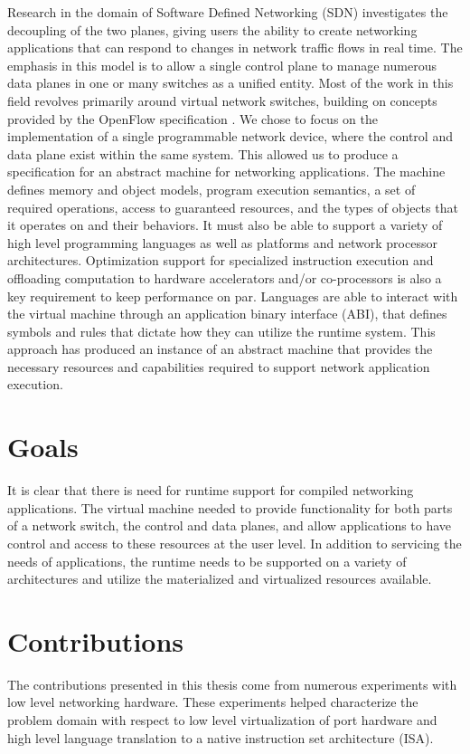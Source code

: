Research in the domain of Software Defined Networking (SDN) investigates the
decoupling of the two planes, giving users the ability to create networking
applications that can respond to changes in network traffic flows in real time.
The emphasis in this model is to allow a single control plane to manage
numerous data planes in one or many switches as a unified entity. Most of the
work in this field revolves primarily around virtual network switches,
building on concepts provided by the OpenFlow specification \cite{openflow}.
We chose to focus on the implementation of a single programmable network
device, where the control and data plane exist within the same system. This
allowed us to produce a specification for an abstract machine for networking
applications. The machine defines memory and object models, program execution
semantics, a set of required operations, access to guaranteed resources, and
the types of objects that it operates on and their behaviors. It must also be
able to support a variety of high level programming languages as well as
platforms and network processor architectures. Optimization support for
specialized instruction execution and offloading computation to hardware
accelerators and/or co-processors is also a key requirement to keep
performance on par. Languages are able to interact with the virtual machine
through an application binary interface (ABI), that defines symbols and rules
that dictate how they can utilize the runtime system. This approach has
produced an instance of an abstract machine that provides the necessary
resources and capabilities required to support network application execution.


\section{Goals}
\label{intro:goals}
It is clear that there is need for runtime support for compiled
networking applications. The virtual machine needed to provide functionality
for both parts of a network switch, the control and data planes, and allow
applications to have control and access to these resources at the user level.
In addition to servicing the needs of applications, the runtime needs to be
supported on a variety of architectures and utilize the materialized and
virtualized resources available.

\section{Contributions}
\label{intro:contrib}
The contributions presented in this thesis come from numerous experiments with
low level networking hardware. These experiments helped characterize the
problem domain with respect to low level virtualization of port hardware and
high level language translation to a native instruction set architecture (ISA).

